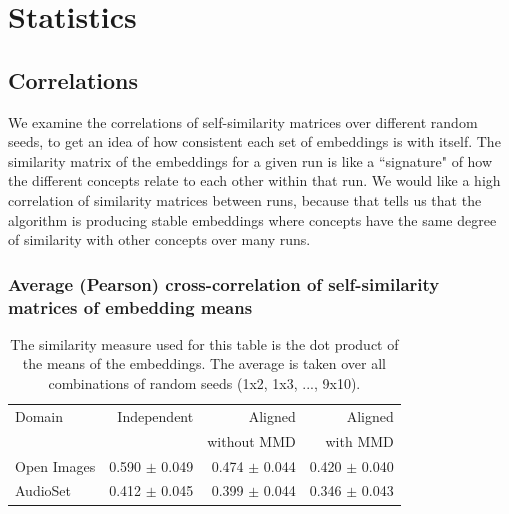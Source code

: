 \section{Statistics}

\subsection{Correlations}

We examine the correlations of self-similarity matrices over different random seeds, to get an idea of how consistent each set of embeddings is with itself. The similarity matrix of the embeddings for a given run is like a ``signature" of how the different concepts relate to each other within that run. We would like a high correlation of similarity matrices between runs, because that tells us that the algorithm is producing stable embeddings where concepts have the same degree of similarity with other concepts over many runs. 

\subsubsection{Average (Pearson) cross-correlation of self-similarity matrices of embedding means}

\begin{table}[H]
\centering
\begin{tabular}{lrrr}
\toprule
Domain &   Independent & Aligned     &  Aligned  \\
       &               & without MMD &  with MMD \\
\midrule
Open Images    & 0.590 $\pm$ 0.049 & 0.474 $\pm$ 0.044 &     0.420 $\pm$  0.040 \\
AudioSet    & 0.412 $\pm$ 0.045 &  0.399 $\pm$ 0.044  &      0.346  $\pm$ 0.043  \\
\bottomrule
\end{tabular}
\caption{\label{table:corrmeans}The similarity measure used for this table is the dot product of the means of the embeddings. The average is taken over all combinations of random seeds (1x2, 1x3, ..., 9x10).}
\end{table}

